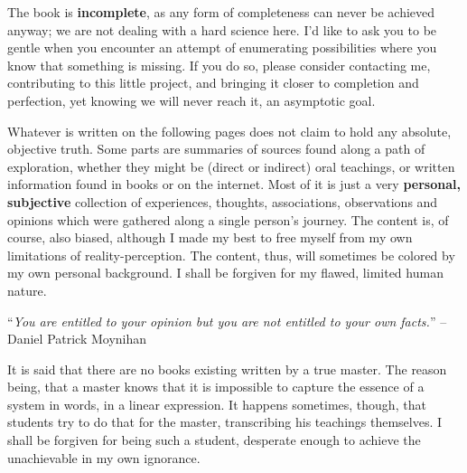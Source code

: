 The book is \textbf{incomplete}, as any form of completeness can never be achieved anyway; we are not dealing with a hard science here.
I'd like to ask you to be gentle when you encounter an attempt of enumerating possibilities where you know that something is missing.
If you do so, please consider contacting me, contributing to this little project, and bringing it closer to completion and perfection, yet knowing we will never reach it, an asymptotic goal.

Whatever is written on the following pages does not claim to hold any absolute, objective truth.
Some parts are summaries of sources found along a path of exploration, whether they might be (direct or indirect) oral teachings, or written information found in books or on the internet.
Most of it is just a very \textbf{personal, subjective} collection of experiences, thoughts, associations, observations and opinions which were gathered along a single person's journey.
The content is, of course, also biased, although I made my best to free myself from my own limitations of reality-perception.
The content, thus, will sometimes be colored by my own personal background.
I shall be forgiven for my flawed, limited human nature.

\begin{displayquote}
    ``\textit{You are entitled to your opinion but you are not entitled to your own facts.}'' -- Daniel Patrick Moynihan
\end{displayquote}

It is said that there are no books existing written by a true master.
The reason being, that a master knows that it is impossible to capture the essence of a system in words, in a linear expression.
It happens sometimes, though, that students try to do that for the master, transcribing his teachings themselves.
I shall be forgiven for being such a student, desperate enough to achieve the unachievable in my own ignorance.
